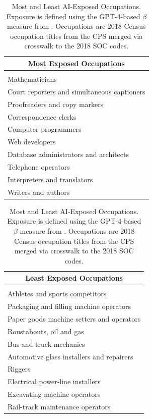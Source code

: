 \documentclass[12pt]{article}
\numberwithin{equation}{section}
\theoremstyle{theorem}\newcustomtheorem{theorem}{{\bf\sc Theorem}}
\theoremstyle{definition}\newcustomtheorem{assumption}{{\bf\sc Assumption}}
\theoremstyle{theorem} \newcustomtheorem{proposition}{{\bf\sc Proposition}}
\begin{document}
\begin{table}[htbp]
	\centering
	\caption{Most and Least AI-Exposed Occupations. Exposure is defined using the GPT-4-based $\beta$ measure from \citet{eloundou_gpts_2023}. Occupations are 2018 Census occupation titles from the CPS merged via crosswalk to the 2018 SOC codes.}
	\begin{minipage}{0.48\textwidth}
		\centering
		\begin{tabular}{l}
			\hline
			\multicolumn{1}{c}{\textbf{Most Exposed Occupations}} \\
			\hline
			\\[-0.8em]
			Mathematicians \\[0.5em]
			Court reporters and simultaneous captioners \\[0.5em]
			Proofreaders and copy markers \\[0.5em]
			Correspondence clerks \\[0.5em]
			Computer programmers \\[0.5em]
			Web developers \\[0.5em]
			Database administrators and architects \\[0.5em]
			Telephone operators \\[0.5em]
			Interpreters and translators \\[0.5em]
			Writers and authors \\[0.5em]
			\hline
		\end{tabular}
	\end{minipage}
	\hfill
	\begin{minipage}{0.48\textwidth}
		\centering
		\begin{tabular}{l}
			\hline
			\multicolumn{1}{c}{\textbf{Least Exposed Occupations}} \\
			\hline
			\\[-0.8em]
			Athletes and sports competitors \\[0.5em]
			Packaging and filling machine operators \\[0.5em]
			Paper goods machine setters and operators \\[0.5em]
			Roustabouts, oil and gas \\[0.5em]
			Bus and truck mechanics \\[0.5em]
			Automotive glass installers and repairers \\[0.5em]
			Riggers \\[0.5em]
			Electrical power-line installers \\[0.5em]
			Excavating machine operators \\[0.5em]
			Rail-track maintenance operators \\[0.5em]
			\hline
		\end{tabular}
	\end{minipage}
	\label{tab:ai_exposure}
\end{table}
\end{document}
